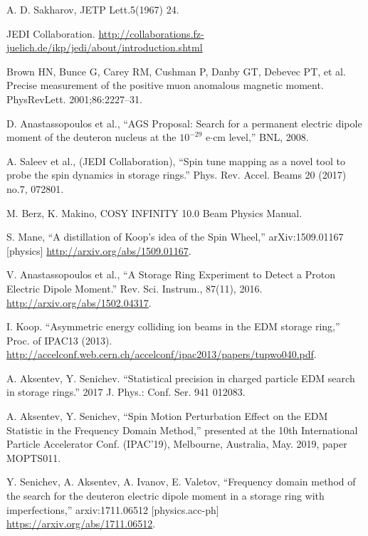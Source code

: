 \documentclass[]{elsarticle}
\begin{document}
\begin{thebibliography}{9}

  A. D. Sakharov, JETP Lett.5(1967) 24.

  JEDI Collaboration. \url{http://collaborations.fz-juelich.de/ikp/jedi/about/introduction.shtml}

  Brown HN, Bunce G, Carey RM, Cushman P, Danby GT, Debevec PT, et al.
  Precise measurement of the positive muon anomalous magnetic moment. PhysRevLett. 2001;86:2227–31. 

  
  D. Anastassopoulos et al., ``AGS Proposal: Search for a permanent electric dipole moment of
  the deuteron nucleus at the $10^{-29}$ e$\cdot$cm level,'' BNL, 2008.

  A. Saleev et al., (JEDI Collaboration), ``Spin tune mapping as a novel tool to probe
  the spin dynamics in storage rings.'' Phys. Rev. Accel. Beams 20 (2017) no.7, 072801.

  M. Berz, K. Makino, COSY INFINITY 10.0 Beam Physics Manual.

  S. Mane, ``A distillation of Koop's idea of the Spin Wheel,'' arXiv:1509.01167 [physics]
  \url{http://arxiv.org/abs/1509.01167}.

  V. Anastassopoulos et al., ``A Storage Ring Experiment to Detect a Proton Electric Dipole Moment.''
  Rev. Sci. Instrum., 87(11), 2016.
  \url{http://arxiv.org/abs/1502.04317}.

  I. Koop. ``Asymmetric energy colliding ion beams in the EDM storage ring,'' Proc. of IPAC13 (2013).
  \url{http://accelconf.web.cern.ch/accelconf/ipac2013/papers/tupwo040.pdf}.

  A. Aksentev, Y. Senichev. ``Statistical precision in charged particle EDM search in storage rings.''
  2017 J. Phys.: Conf. Ser. 941 012083.

  A. Aksentev, Y. Senichev, ``Spin Motion Perturbation Effect on the EDM Statistic
  in the Frequency Domain Method,'' presented at the 10th International Particle Accelerator Conf. (IPAC'19),
  Melbourne, Australia, May. 2019, paper MOPTS011.

  Y. Senichev, A. Aksentev, A. Ivanov, E. Valetov, ``Frequency domain method of the search for
  the deuteron electric dipole moment in a storage ring with imperfections,'' arxiv:1711.06512 [physics.acc-ph]
  \url{https://arxiv.org/abs/1711.06512}.


\end{thebibliography}
\end{document}
